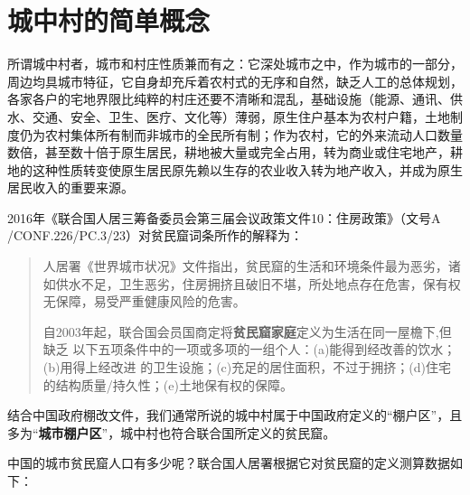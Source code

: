 \chapter{城中村的简单概念}

所谓城中村者，城市和村庄性质兼而有之：它深处城市之中，作为城市的一部分，周边均具城市特征，它自身却充斥着农村式的无序和自然，缺乏人工的总体规划，各家各户的宅地界限比纯粹的村庄还要不清晰和混乱，基础设施（能源、通讯、供水、交通、安全、卫生、医疗、文化等）薄弱，原生住户基本为农村户籍，土地制度仍为农村集体所有制而非城市的全民所有制；作为农村，它的外来流动人口数量数倍，甚至数十倍于原生居民，耕地被大量或完全占用，转为商业或住宅地产，耕地的这种性质转变使原生居民原先赖以生存的农业收入转为地产收入，并成为原生居民收入的重要来源。

2016年《联合国人居三筹备委员会第三届会议政策文件10：住房政策》（文号A /CONF.226/PC.3/23）对贫民窟词条所作的解释为：
\begin{quotation}人居署《世界城市状况》文件指出，贫民窟的生活和环境条件最为恶劣，诸如供水不足，卫生恶劣，住房拥挤且破旧不堪，所处地点存在危害，保有权无保障，易受严重健康风险的危害。

  自2003年起，联合国会员国商定将\textbf{贫民窟家庭}定义为生活在同一屋檐下,但缺乏
  以下五项条件中的一项或多项的一组个人：(a)能得到经改善的饮水；(b)用得上经改进
  的卫生设施；(c)充足的居住面积，不过于拥挤；(d)住宅的结构质量/持久性；(e)土地保有权的保障。
\end{quotation}

结合中国政府棚改文件，我们通常所说的城中村属于中国政府定义的“棚户区”，且多为“\textbf{城市棚户区}”，城中村也符合联合国所定义的贫民窟。\cite{unandchina}


中国的城市贫民窟人口有多少呢？联合国人居署根据它对贫民窟的定义测算数据如下：%
\begin{table}[!ht] \centering
\label{my-label}%
  \caption{1990-2014年中国城市贫民窟人口比例及数量}
  \end{table}

